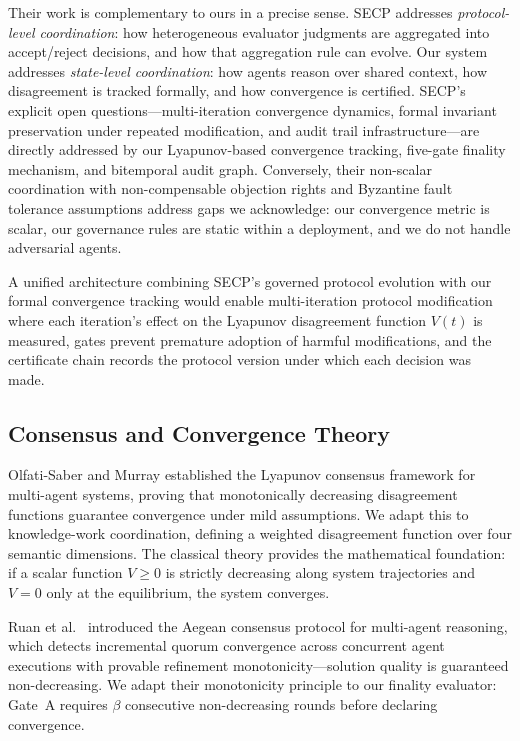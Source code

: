 \documentclass[11pt]{article}
\begin{document}
Their work is complementary to ours in a precise sense. SECP addresses \emph{protocol-level coordination}: how heterogeneous evaluator judgments are aggregated into accept/reject decisions, and how that aggregation rule can evolve. Our system addresses \emph{state-level coordination}: how agents reason over shared context, how disagreement is tracked formally, and how convergence is certified. SECP's explicit open questions---multi-iteration convergence dynamics, formal invariant preservation under repeated modification, and audit trail infrastructure---are directly addressed by our Lyapunov-based convergence tracking, five-gate finality mechanism, and bitemporal audit graph. Conversely, their non-scalar coordination with non-compensable objection rights and Byzantine fault tolerance assumptions address gaps we acknowledge: our convergence metric is scalar, our governance rules are static within a deployment, and we do not handle adversarial agents.

A unified architecture combining SECP's governed protocol evolution with our formal convergence tracking would enable multi-iteration protocol modification where each iteration's effect on the Lyapunov disagreement function $V(t)$ is measured, gates prevent premature adoption of harmful modifications, and the certificate chain records the protocol version under which each decision was made.

\subsection{Consensus and Convergence Theory}

Olfati-Saber and Murray \cite{olfati2004} established the Lyapunov consensus framework for multi-agent systems, proving that monotonically decreasing disagreement functions guarantee convergence under mild assumptions. We adapt this to knowledge-work coordination, defining a weighted disagreement function over four semantic dimensions. The classical theory \cite{lyapunov1892} provides the mathematical foundation: if a scalar function $V \geq 0$ is strictly decreasing along system trajectories and $V = 0$ only at the equilibrium, the system converges.

Ruan et al.\ \cite{ruan2025} introduced the Aegean consensus protocol for multi-agent reasoning, which detects incremental quorum convergence across concurrent agent executions with provable refinement monotonicity---solution quality is guaranteed non-decreasing. We adapt their monotonicity principle to our finality evaluator: Gate~A requires $\beta$ consecutive non-decreasing rounds before declaring convergence.
\end{document}
